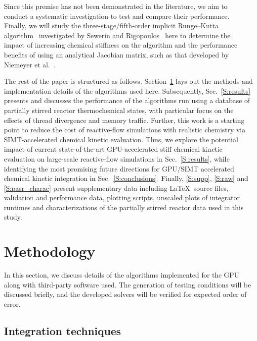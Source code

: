 \documentclass[preprint,review,11pt]{elsarticle}
\begin{document}
Since this premise has not been demonstrated in the literature, we aim to conduct a systematic investigation to test and compare their performance.
Finally, we will study the three-stage\slash fifth-order implicit Runge--Kutta algorithm~\cite{wanner1991solving} investigated by Sewerin and Rigopoulos~\cite{Sewerin20151375} here to determine the impact of increasing chemical stiffness on the algorithm and the performance benefits of using an analytical Jacobian matrix, such as that developed by Niemeyer et al.~\cite{niemeyer_2016_51139,Niemeyer:2015ws,Niemeyer:2016aa}.

The rest of the paper is structured as follows.
Section~\ref{S:method} lays out the methods and implementation details of the algorithms used here.
Subsequently, Sec.~\ref{S:results} presents and discusses the performance of the algorithms run using a database of partially stirred reactor thermochemical states, with particular focus on the effects of thread divergence and memory traffic.
Further, this work is a starting point to reduce the cost of reactive-flow simulations with realistic chemistry via SIMT-accelerated chemical kinetic evaluation.
Thus, we explore the potential impact of current state-of-the-art GPU-accelerated stiff chemical kinetic evaluation on large-scale reactive-flow simulations in Sec.~\ref{S:results}, while identifying the most promising future directions for GPU\slash SIMT accelerated chemical kinetic integration in Sec.~\ref{S:conclusions}.
Finally, \ref{S:supp}, \ref{S:raw} and \ref{S:pasr_charac} present supplementary data including \LaTeX\ source files, validation and performance data, plotting scripts, unscaled plots of integrator runtimes and characterizations of the partially stirred reactor data used in this study.

\section{Methodology}
\label{S:method}

In this section, we discuss details of the algorithms implemented for the GPU along with third-party software used.
The generation of testing conditions will be discussed briefly, and the developed solvers will be verified for expected order of error.

\subsection{Integration techniques}
\end{document}
